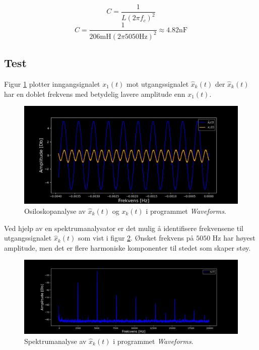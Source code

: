 \documentclass[a4paper,11pt,norsk]{article}
\begin{document}
\begin{equation*}
    C = \frac{1}{L(2\pi f_c)^2}
\end{equation*}
\begin{equation*}
    C = \frac{1}{206\mathrm{mH}(2\pi 5050\mathrm{Hz})^2} \approx 4.82 \mathrm{nF}
\end{equation*}



\subsection{Test}

Figur \ref{fig:osiloskop} plotter inngangsignalet $x_1(t)$ mot utgangssignalet $\hat{x}_k(t)$ der $\hat{x}_k(t)$ har en doblet frekvens med betydelig lavere amplitude enn ${x}_1(t)$. 

\begin{figure}[H]
  \centering
  \includegraphics[scale=0.542]{D1/Images/Scope.png}
  \caption{Osiloskopanalyse av $\hat{x}_k(t)$ og $x_k(t)$ i programmet \emph{Waveforms}.}
  \label{fig:osiloskop}
\end{figure}
Ved hjelp av en spektrumanalysator er det mulig å identifisere frekvensene til utgangssignalet $\hat{x}_k(t)$ som vist i figur \ref{fig:spectrum}. Ønsket frekvens på $5050$ Hz har høyest amplitude, men det er flere harmoniske komponenter til stedet som skaper støy. 

\begin{figure}[H]
  \centering
  \includegraphics[scale=0.442]{D1/Images/Spectrum2.png}
  \caption{Spektrumanalyse av $\hat{x}_k(t)$ i programmet \emph{Waveforms}.}
  \label{fig:spectrum}
\end{figure}
\end{document}
